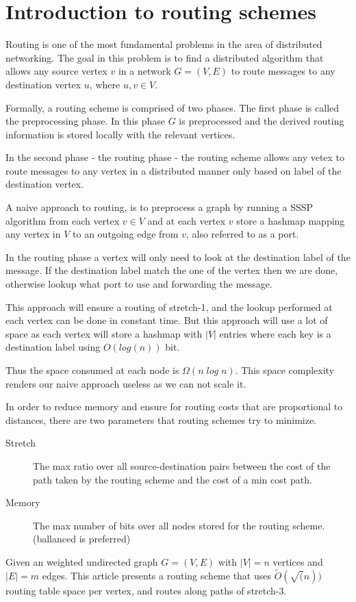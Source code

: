 \chapter{Introduction to routing schemes}

Routing is one of the most fundamental problems in the area of distributed
networking. The goal in this problem is to find a distributed algorithm that
allows any source vertex $v$ in a network $G=(V,E)$ to route messages to any
destination vertex $u$, where $u, v\in V$.

Formally, a routing scheme is comprised of two phases. The first phase is
called the preprocessing phase. In this phase $G$ is preprocessed and the
derived routing information is stored locally with the relevant vertices.

In the second phase - the routing phase - the routing scheme allows any vetex
to route messages to any vertex in a distributed manner only based on label of
the destination vertex.

A naive approach to routing, is to preprocess a graph by running a SSSP
algorithm from each vertex $v \in V$ and at each vertex $v$ store a hashmap
mapping any vertex in $V$ to an outgoing edge from $v$, also
referred to as a port.

In the routing phase a vertex will only need to look at the destination label
of the message. If the destination label match the one of the vertex then we
are done, otherwise lookup what port to use and forwarding the message.

This approach will ensure a routing of stretch-1, and the lookup performed at
each vertex can be done in constant time. But this approach will use a lot of
space as each vertex will store a hashmap with $|V|$ entries where each key is
a destination label using $O(log(n))$ bit.

Thus the space consumed at each node is $\Omega (n\; log\; n)$. This space
complexity renders our naive approach useless as we can not scale it.

In order to reduce memory and ensure for routing costs that are proportional
to distances, there are two parameters that routing schemes try to minimize.
\begin{description}
  \item[Stretch] The max ratio over all source-destination pairs between the
      cost of the path taken by the routing scheme and the cost of a min
      cost path.
  \item[Memory] The max number of bits over all nodes stored for the routing
      scheme. (ballanced is preferred)
\end{description}
Given an weighted undirected graph $G=(V,E)$ with $|V|=n$ vertices and $|E|=m$
edges. This article presents a routing scheme that uses $\tilde{O}(\sqrt(n))$
routing table space per vertex, and routes along paths of stretch-3.

